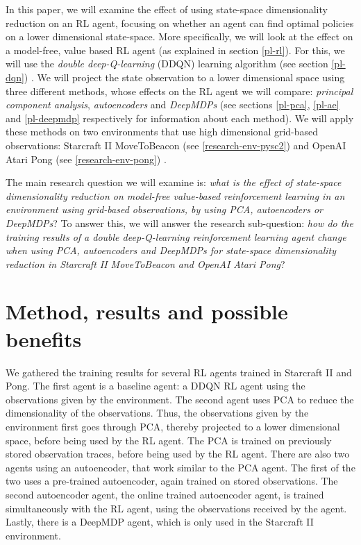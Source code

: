 In this paper, we will examine the effect of using state-space dimensionality reduction on an RL agent, focusing on whether an agent can find optimal policies on a lower dimensional state-space. More specifically, we will look at the effect on a model-free, value based RL agent (as explained in section \ref{pl-rl}). For this, we will use the \emph{double deep-Q-learning} (DDQN) learning algorithm (see section \ref{pl-dqn}) \cite{ddqn}. We will project the state observation to a lower dimensional space using three different methods, whose effects on the RL agent we will compare: \emph{principal component analysis}, \emph{autoencoders} and \emph{DeepMDPs} (see sections \ref{pl-pca}, \ref{pl-ae} and \ref{pl-deepmdp} respectively for information about each method). We will apply these methods on two environments that use high dimensional grid-based observations: Starcraft II MoveToBeacon (see \ref{research-env-pysc2}) and OpenAI Atari Pong (see \ref{research-env-pong}) \cite{pysc2}\cite{pong}.

The main research question we will examine is: \textit{what is the effect of state-space dimensionality reduction on model-free value-based reinforcement learning in an environment using grid-based observations, by using PCA, autoencoders or DeepMDPs}? To answer this, we will answer the research sub-question: \textit{how do the training results of a double deep-Q-learning reinforcement learning agent change when using PCA, autoencoders and DeepMDPs for state-space dimensionality reduction in Starcraft II MoveToBeacon and OpenAI Atari Pong}?

\section{Method, results and possible benefits}
We gathered the training results for several RL agents trained in Starcraft II and Pong. The first agent is a baseline agent: a DDQN RL agent using the observations given by the environment. The second agent uses PCA to reduce the dimensionality of the observations. Thus, the observations given by the environment first goes through PCA, thereby projected to a lower dimensional space, before being used by the RL agent. The PCA is trained on previously stored observation traces, before being used by the RL agent. There are also two agents using an autoencoder, that work similar to the PCA agent. The first of the two uses a pre-trained autoencoder, again trained on stored observations. The second autoencoder agent, the online trained autoencoder agent, is trained simultaneously with the RL agent, using the observations received by the agent. Lastly, there is a DeepMDP agent, which is only used in the Starcraft II environment.


